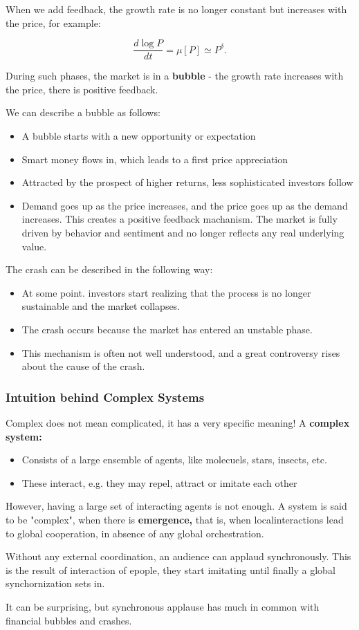 \documentclass[a4paper]{extarticle}
\begin{document}
When we add feedback, the growth rate is no longer constant but increases with the price, for example:

\[
    \frac{d \log P}{dt} = \mu [P] \simeq P^{\delta}.
\]

During such phases, the market is in a \textbf{bubble} - the growth rate increases with the price, there is positive feedback.

We can describe a bubble as follows:

\begin{itemize}
    \item A bubble starts with a new opportunity or expectation
    \item Smart money flows in, which leads to a first price appreciation
    \item Attracted by the prospect of higher returns, less sophisticated investors follow
    \item Demand goes up as the price increases, and the price goes up as the demand increases. This creates a positive feedback machanism. The market is fully driven by behavior and sentiment and no longer reflects any real underlying value.
\end{itemize}

The crash can be described in the following way:

\begin{itemize}
    \item At some point. investors start realizing that the process is no longer sustainable and the market collapses.
    \item The crash occurs because the market has entered an unstable phase.
    \item This mechanism is often not well understood, and a great controversy rises about the cause of the crash.
\end{itemize}

\subsubsection{Intuition behind Complex Systems}

Complex does not mean complicated, it has a very specific meaning! A \textbf{complex system:}

\begin{itemize}
    \item Consists of a large ensemble of agents, like molecuels, stars, insects, etc.
    \item These interact, e.g. they may repel, attract or imitate each other
\end{itemize}

However, having a large set of interacting agents is not enough. A system is said to be "complex", when there is \textbf{emergence,} that is, when localinteractions lead to global cooperation, in absence of any global orchestration.

Without any external coordination, an audience can applaud synchronously. This is the result of interaction of epople, they start imitating until finally a global synchornization sets in.

It can be surprising, but synchronous applause has much in common with financial bubbles and crashes.
\end{document}
